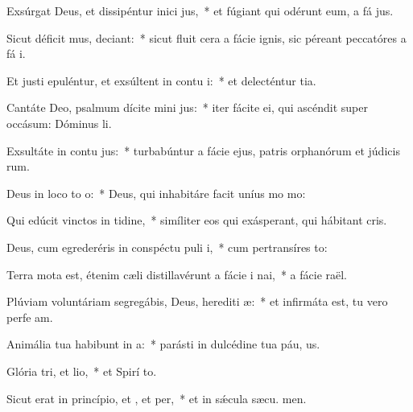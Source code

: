 \item Exsúrgat Deus, et dissipéntur inici jus,~* et fúgiant qui odérunt eum, a fá jus.
\item Sicut déficit mus, deciant:~* sicut fluit cera a fácie ignis, sic péreant peccatóres a fá i.
\item Et justi epuléntur, et exsúltent in contu i:~* et delecténtur  tia.
\item Cantáte Deo, psalmum dícite mini jus:~* iter fácite ei, qui ascéndit super occásum: Dóminus  li.
\item Exsultáte in contu jus:~* turbabúntur a fácie ejus, patris orphanórum et júdicis rum.
\item Deus in loco to o:~* Deus, qui inhabitáre facit uníus mo  mo:
\item Qui edúcit vinctos in tidine,~* simíliter eos qui exásperant, qui hábitant  cris.
\item Deus, cum egrederéris in conspéctu puli i,~* cum pertransíres  to:
\item Terra mota est, étenim cæli distillavérunt a fácie i nai,~* a fácie  raël.
\item Plúviam voluntáriam segregábis, Deus, herediti æ:~* et infirmáta est, tu vero perfe am.
\item Animália tua habibunt in a:~* parásti in dulcédine tua páu, us.
\item Glória tri, et lio,~* et Spirí to.
\item Sicut erat in princípio, et , et per,~* et in sǽcula sæcu. men.
